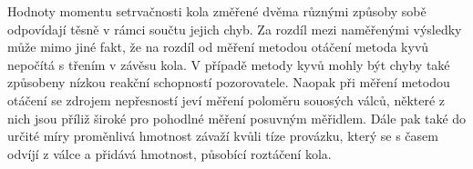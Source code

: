 \documentclass[protokol.tex]{subfiles}
\begin{document}
Hodnoty momentu setrvačnosti kola změřené dvěma různými způsoby sobě odpovídají těsně v rámci součtu jejich chyb. Za rozdíl mezi naměřenými výsledky může mimo jiné fakt, že na rozdíl od měření metodou otáčení metoda kyvů nepočítá s třením v závěsu kola. V případě metody kyvů mohly být chyby také způsobeny nízkou reakční schopností pozorovatele. 
Naopak při měření metodou otáčení se zdrojem nepřesností jeví měření poloměru souosých válců, některé z nich jsou příliž široké pro pohodlné měření posuvným měřidlem. Dále pak také do určité míry proměnlivá hmotnost závaží kvůli tíze provázku, který se s časem odvíjí z válce a přidává hmotnost, působící roztáčení kola.
\end{document}
